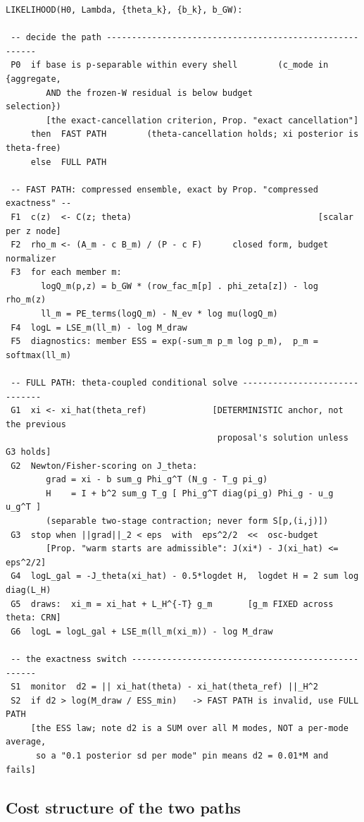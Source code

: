 \begin{verbatim}
LIKELIHOOD(H0, Lambda, {theta_k}, {b_k}, b_GW):

 -- decide the path --------------------------------------------------------
 P0  if base is p-separable within every shell        (c_mode in {aggregate,
        AND the frozen-W residual is below budget            selection})
        [the exact-cancellation criterion, Prop. "exact cancellation"]
     then  FAST PATH        (theta-cancellation holds; xi posterior is theta-free)
     else  FULL PATH

 -- FAST PATH: compressed ensemble, exact by Prop. "compressed exactness" --
 F1  c(z)  <- C(z; theta)                                     [scalar per z node]
 F2  rho_m <- (A_m - c B_m) / (P - c F)      closed form, budget normalizer
 F3  for each member m:
       logQ_m(p,z) = b_GW * (row_fac_m[p] . phi_zeta[z]) - log rho_m(z)
       ll_m = PE_terms(logQ_m) - N_ev * log mu(logQ_m)
 F4  logL = LSE_m(ll_m) - log M_draw
 F5  diagnostics: member ESS = exp(-sum_m p_m log p_m),  p_m = softmax(ll_m)

 -- FULL PATH: theta-coupled conditional solve ------------------------------
 G1  xi <- xi_hat(theta_ref)             [DETERMINISTIC anchor, not the previous
                                          proposal's solution unless G3 holds]
 G2  Newton/Fisher-scoring on J_theta:
        grad = xi - b sum_g Phi_g^T (N_g - T_g pi_g)
        H    = I + b^2 sum_g T_g [ Phi_g^T diag(pi_g) Phi_g - u_g u_g^T ]
        (separable two-stage contraction; never form S[p,(i,j)])
 G3  stop when ||grad||_2 < eps  with  eps^2/2  <<  osc-budget
        [Prop. "warm starts are admissible": J(xi*) - J(xi_hat) <= eps^2/2]
 G4  logL_gal = -J_theta(xi_hat) - 0.5*logdet H,  logdet H = 2 sum log diag(L_H)
 G5  draws:  xi_m = xi_hat + L_H^{-T} g_m       [g_m FIXED across theta: CRN]
 G6  logL = logL_gal + LSE_m(ll_m(xi_m)) - log M_draw

 -- the exactness switch ---------------------------------------------------
 S1  monitor  d2 = || xi_hat(theta) - xi_hat(theta_ref) ||_H^2
 S2  if d2 > log(M_draw / ESS_min)   -> FAST PATH is invalid, use FULL PATH
     [the ESS law; note d2 is a SUM over all M modes, NOT a per-mode average,
      so a "0.1 posterior sd per mode" pin means d2 = 0.01*M and fails]
\end{verbatim}

\subsection{Cost structure of the two paths}

